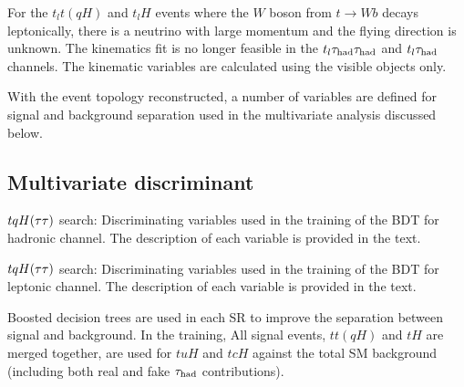 For the  $t_lt(qH)$ and $t_lH$ events where the $W$ boson from $t\to W b$ decays leptonically, there is a neutrino with large momentum and the flying direction is unknown. The kinematics fit is no longer feasible in the $t_l\tau_{\mathrm{had}} \tau_{\mathrm{had}}$ and $t_l\tau_{\mathrm{had}}$ channels. The kinematic variables are calculated using the visible
objects only.

With the event topology reconstructed, a number of variables are defined for signal and background separation used in the multivariate analysis discussed below.


\subsection{Multivariate discriminant}

\begin{table*}[t!]
\caption{\small{$tqH(\tau\tau)$ search: Discriminating variables used in the training of the BDT for hadronic channel. 
    The description of each variable is provided in the text.}}
\label{tab:importance_xTFW}

\end{table*}


\begin{table*}[t!]
\caption{\small{$tqH(\tau\tau)$ search: Discriminating variables used in the training of the BDT for leptonic channel. 
    The description of each variable is provided in the text.}}
\label{tab:importance_tthML}

\end{table*}

Boosted decision trees are used in each SR to improve the separation between signal and background. 
In the training, All signal events, $tt(qH)$ and $tH$ are merged together, are used for $tuH$ and $tcH$ against the total SM background (including both real and fake $\tau_{\mathrm{had}}$ contributions).


